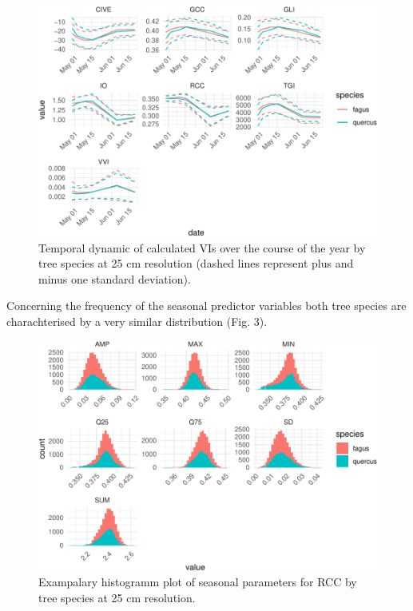 \documentclass[]{article}
\begin{document}
\begin{figure}[H]

{\centering \includegraphics{report_files/figure-latex/predictor_plots_indices-1} 

}

\caption{Temporal dynamic of calculated VIs over the course of the year by tree species at 25 cm resolution (dashed lines represent plus and minus one standard deviation).}\label{fig:predictor_plots_indices}
\end{figure}

Concerning the frequency of the seasonal predictor variables both tree
species are charachterised by a very similar distribution (Fig. 3).

\begin{figure}[H]

{\centering \includegraphics{report_files/figure-latex/example_seasonal_plots-1} 

}

\caption{Exampalary histogramm plot of seasonal parameters for RCC by tree species at 25 cm resolution.}\label{fig:example_seasonal_plots}
\end{figure}
\end{document}
